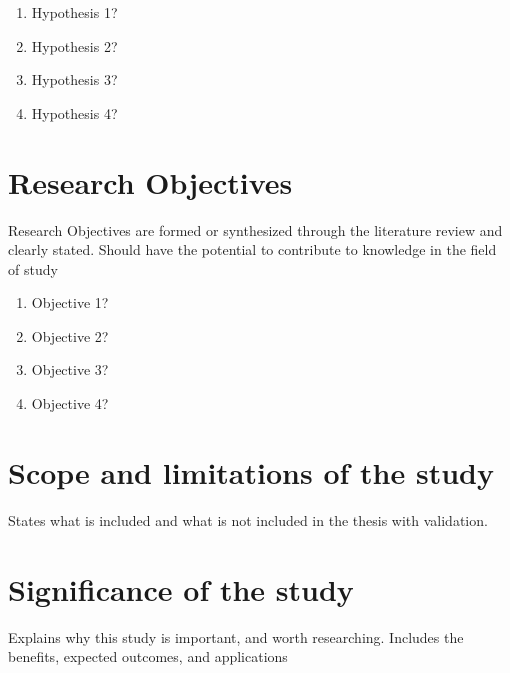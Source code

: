 \begin{enumerate}
	\item Hypothesis 1?
	\item Hypothesis 2?
	\item Hypothesis 3?
	\item Hypothesis 4?
\end{enumerate}
\section{Research Objectives}
Research Objectives are formed or synthesized through the literature review and clearly stated. Should have the potential to contribute to knowledge in the field of study
\begin{enumerate}
	\item Objective 1?
	\item Objective 2?
	\item Objective 3?
	\item Objective 4?
\end{enumerate}

\section{Scope and limitations of the study}
States what is included and what is not included in the thesis with validation.
\section{Significance of the study}
Explains why this study is important, and worth researching. Includes the benefits, expected outcomes, and applications
\clearpage
\newpage